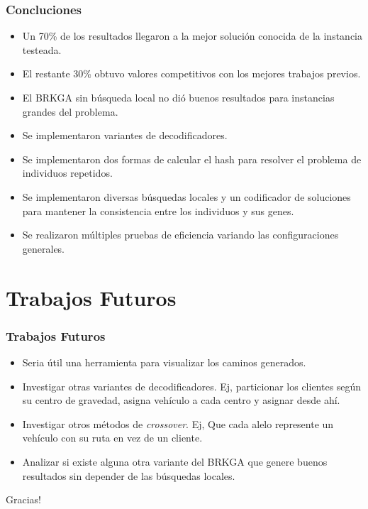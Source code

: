 \documentclass{beamer}
\begin{document}
\begin{frame}
\frametitle{Concluciones}

\begin{itemize}
    \item Un 70\% de los resultados llegaron a la mejor solución conocida de la instancia testeada.
    \pause
    \item El restante 30\% obtuvo valores competitivos con los mejores trabajos previos.
    \pause
    \item El BRKGA sin búsqueda local no dió buenos resultados para instancias grandes del problema.
    \pause
    \item Se implementaron variantes de decodificadores.
    \pause
    \item Se implementaron dos formas de calcular el hash para resolver el problema de individuos repetidos.
    \pause
    \item Se implementaron diversas búsquedas locales y un codificador de soluciones para mantener la consistencia entre los individuos y sus genes.
    \pause
    \item Se realizaron múltiples pruebas de eficiencia variando las configuraciones generales.
\end{itemize}

\end{frame}


\section{Trabajos Futuros}

\begin{frame}
\frametitle{Trabajos Futuros}

\begin{itemize}
    \item Seria útil una herramienta para visualizar los caminos generados.
    \pause
    \item Investigar otras variantes de decodificadores. Ej, particionar los clientes según su centro de gravedad, asigna vehículo a cada centro y asignar desde ahí.
    \pause
    \item Investigar otros métodos de \textit{crossover}. Ej, Que cada alelo represente un vehículo con su ruta en vez de un cliente.
    \pause
    \item Analizar si existe alguna otra variante del BRKGA que genere buenos resultados sin depender de las búsquedas locales.
\end{itemize}

\end{frame}



\begin{frame}
\Huge{\centerline{Gracias!}}
\end{frame}

\end{document}
